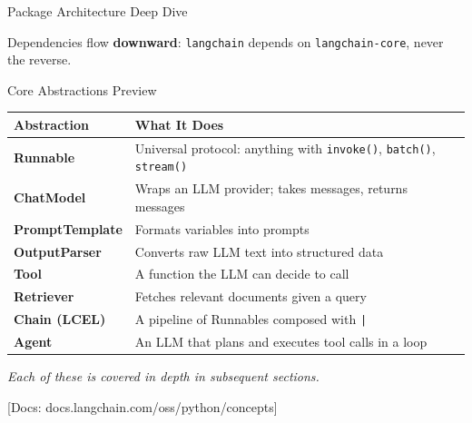 \documentclass[aspectratio=169,11pt]{beamer}
\newcommand{\docref}[1]{{\scriptsize\color{docgray}[Docs: #1]}}
\begin{document}
\begin{frame}{Package Architecture Deep Dive}

\begin{center}
\end{center}

\vspace{0.1cm}
\begin{conceptbox}
Dependencies flow \textbf{downward}: \texttt{langchain} depends on \texttt{langchain-core}, never the reverse.
\end{conceptbox}
\end{frame}

\begin{frame}{Core Abstractions Preview}

\begin{center}
\renewcommand{\arraystretch}{1.2}
\footnotesize
\begin{tabular}{lp{7.5cm}}
\toprule
\textbf{Abstraction} & \textbf{What It Does} \\
\midrule
\textbf{Runnable} & Universal protocol: anything with \texttt{invoke()}, \texttt{batch()}, \texttt{stream()} \\
\textbf{ChatModel} & Wraps an LLM provider; takes messages, returns messages \\
\textbf{PromptTemplate} & Formats variables into prompts \\
\textbf{OutputParser} & Converts raw LLM text into structured data \\
\textbf{Tool} & A function the LLM can decide to call \\
\textbf{Retriever} & Fetches relevant documents given a query \\
\textbf{Chain (LCEL)} & A pipeline of Runnables composed with \texttt{|} \\
\textbf{Agent} & An LLM that plans and executes tool calls in a loop \\
\bottomrule
\end{tabular}
\end{center}

\vspace{0.15cm}
\textit{Each of these is covered in depth in subsequent sections.}

\docref{docs.langchain.com/oss/python/concepts}
\end{frame}
\end{document}
